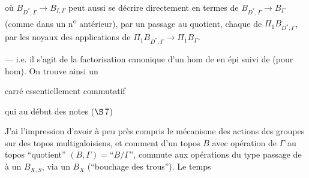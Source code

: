  où $B_{D^*,\Gamma}\longrightarrow B_{I,\Gamma}$ peut aussi se
décrire directement en termes de
$B_{D^*,\Gamma}\longrightarrow B_\Gamma$ (comme dans un n\textsuperscript{o}
antérieur), 
par un passage au
quotient,  chaque 
de $\Pi_1 B_{D^*,\Gamma}$, par les noyaux des applications
 de $\Pi_1 B_{D^*,\Gamma}\longrightarrow\Pi_1 B_\Gamma$.

--- i.e. il s'agit de la factorisation
canonique d'un hom de 
en \unsure{(} épi
 \unsure{)} suivi de 
(pour hom). On trouve ainsi un

carré essentiellement commutatif

qui 
au début des notes  \deleted{\unsure{$\Pi$}}  ($\S\,7$)

J'ai l'impression d'avoir à peu près
compris le mécanisme des actions des
groupes sur des topos multigaloisiens,
et comment 
d'un topos $B$ avec opération de $\Gamma$
au topos ``quotient'' $(B,\Gamma)=\text{``}B/\Gamma\text{''}$,
commute aux opérations du type
passage de
à un $B_{X,S}$, via un
$B_X$ (``bouchage des trous'').  Le temps

